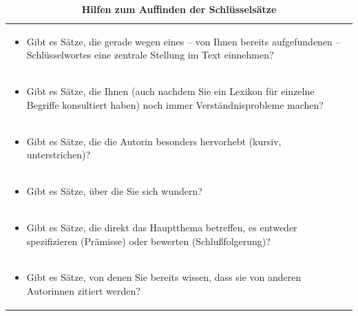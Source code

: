 \documentclass[]{book}
\providecommand{\tightlist}{%
  \setlength{\itemsep}{0pt}\setlength{\parskip}{0pt}}
\theoremstyle{definition}
\theoremstyle{definition}
\theoremstyle{definition}
\theoremstyle{remark}
\begin{document}
\begin{longtable}[]{@{}l@{}}
\caption{\textbf{\label{tab:schluesselsaetze} Hilfen zum Auffinden der
Schlüsselsätze}}\tabularnewline
\toprule
\begin{minipage}[t]{0.97\columnwidth}\raggedright\strut
\begin{itemize}
\tightlist
\item
  Gibt es Sätze, die gerade wegen eines -- von Ihnen bereits
  aufgefundenen -- Schlüsselwortes eine zentrale Stellung im Text
  einnehmen? \vspace{-6mm}
\end{itemize}\strut
\end{minipage}\tabularnewline
\begin{minipage}[t]{0.97\columnwidth}\raggedright\strut
\begin{itemize}
\tightlist
\item
  Gibt es Sätze, die Ihnen (auch nachdem Sie ein Lexikon für einzelne
  Begriffe konsultiert haben) noch immer Verständnisprobleme machen?
  \vspace{-6mm}
\end{itemize}\strut
\end{minipage}\tabularnewline
\begin{minipage}[t]{0.97\columnwidth}\raggedright\strut
\begin{itemize}
\tightlist
\item
  Gibt es Sätze, die die Autorin besonders hervorhebt (kursiv,
  unterstrichen)? \vspace{-6mm}
\end{itemize}\strut
\end{minipage}\tabularnewline
\begin{minipage}[t]{0.97\columnwidth}\raggedright\strut
\begin{itemize}
\tightlist
\item
  Gibt es Sätze, über die Sie sich wundern? \vspace{-6mm}
\end{itemize}\strut
\end{minipage}\tabularnewline
\begin{minipage}[t]{0.97\columnwidth}\raggedright\strut
\begin{itemize}
\tightlist
\item
  Gibt es Sätze, die direkt das Hauptthema betreffen, es entweder
  spezifizieren (Prämisse) oder bewerten (Schlußfolgerung)?
  \vspace{-6mm}
\end{itemize}\strut
\end{minipage}\tabularnewline
\begin{minipage}[t]{0.97\columnwidth}\raggedright\strut
\begin{itemize}
\tightlist
\item
  Gibt es Sätze, von denen Sie bereits wissen, dass sie von anderen
  Autorinnen zitiert werden?
\end{itemize}\strut
\end{minipage}\tabularnewline
\bottomrule
\end{longtable}
\end{document}
